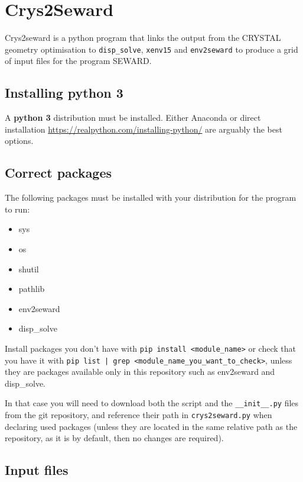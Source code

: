 \section{Crys2Seward}

Crys2seward is a python program that links the output from the CRYSTAL geometry optimisation to \texttt{disp\_solve}, \texttt{xenv15} and \texttt{env2seward} to produce a grid of input files for the program SEWARD.

\subsection{Installing python 3}

A \textbf{python 3} distribution must be installed. Either Anaconda or direct installation \url{https://realpython.com/installing-python/} are arguably the best options. 

\subsection{Correct packages}

The following packages must be installed with your distribution for the program to run:

\begin{itemize}
	\item sys
	\item os
	\item shutil
	\item pathlib
	\item env2seward
	\item disp\_solve
\end{itemize}

Install packages you don't have with \texttt{pip install <module\_name>} or check that you have it with \texttt{pip list | grep <module\_name\_you\_want\_to\_check>}, unless they are packages available only in this repository such as env2seward and disp\_solve.

In that case you will need to download both the script and the \texttt{\_\_init\_\_.py} files from the git repository, and reference their path in \texttt{crys2seward.py} when declaring used packages (unless they are located in the same relative path as the repository, as it is by default, then no changes are required).

\subsection{Input files}


